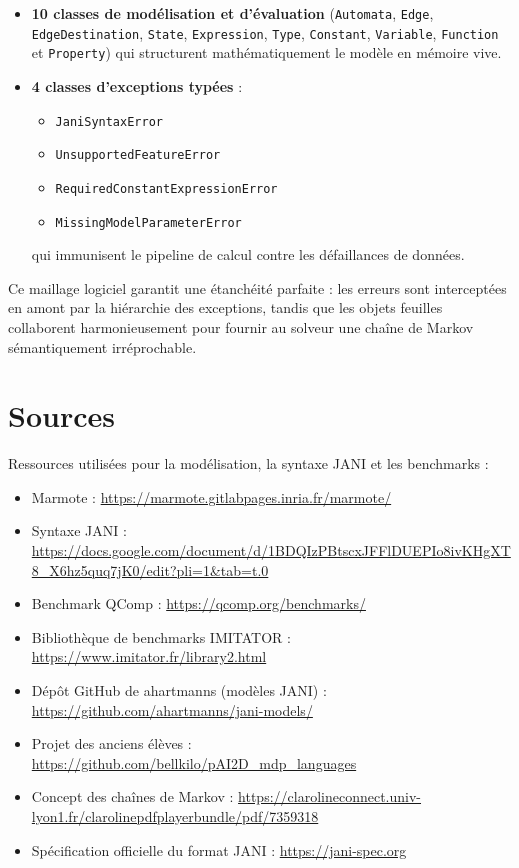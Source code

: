 \documentclass[14pt, a4paper]{extarticle}
\begin{document}
\begin{itemize}
    \item \textbf{10 classes de modélisation et d'évaluation} (\texttt{Automata}, \texttt{Edge}, \texttt{EdgeDestination}, \texttt{State}, \texttt{Expression}, \texttt{Type}, \texttt{Constant}, \texttt{Variable}, \texttt{Function} et \texttt{Property}) qui structurent mathématiquement le modèle en mémoire vive.
    \item \textbf{4 classes d'exceptions typées} :
    \begin{itemize}
        \item \texttt{JaniSyntaxError}
        \item \texttt{UnsupportedFeatureError}
        \item \texttt{RequiredConstantExpressionError}
        \item \texttt{MissingModelParameterError}
    \end{itemize}
    qui immunisent le pipeline de calcul contre les défaillances de données.
\end{itemize}

Ce maillage logiciel garantit une étanchéité parfaite : les erreurs sont interceptées en amont par la hiérarchie des exceptions, tandis que les objets feuilles collaborent harmonieusement pour fournir au solveur une chaîne de Markov sémantiquement irréprochable.

\section*{Sources}
Ressources utilisées pour la modélisation, la syntaxe JANI et les benchmarks :

\begin{itemize}
    \item Marmote : \url{https://marmote.gitlabpages.inria.fr/marmote/}
    \item Syntaxe JANI : \url{https://docs.google.com/document/d/1BDQIzPBtscxJFFlDUEPIo8ivKHgXT8_X6hz5quq7jK0/edit?pli=1&tab=t.0}
    \item Benchmark QComp : \url{https://qcomp.org/benchmarks/}
    \item Bibliothèque de benchmarks IMITATOR : \url{https://www.imitator.fr/library2.html}
    \item Dépôt GitHub de ahartmanns (modèles JANI) : \url{https://github.com/ahartmanns/jani-models/}
    \item Projet des anciens élèves : \url{https://github.com/bellkilo/pAI2D_mdp_languages}
    \item Concept des chaînes de Markov : \url{https://clarolineconnect.univ-lyon1.fr/clarolinepdfplayerbundle/pdf/7359318}
    \item Spécification officielle du format JANI : \url{https://jani-spec.org}
\end{itemize}
\end{document}
